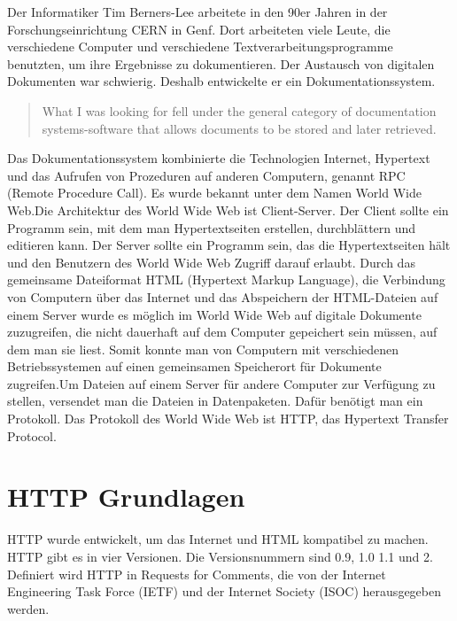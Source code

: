 \documentclass{llncs}
\begin{document}
Der Informatiker Tim Berners-Lee arbeitete in den 90er Jahren in der Forschungseinrichtung CERN in Genf. Dort arbeiteten viele Leute, die verschiedene Computer und verschiedene Textverarbeitungsprogramme benutzten, um ihre Ergebnisse zu dokumentieren. Der Austausch von digitalen Dokumenten war schwierig. Deshalb entwickelte er ein Dokumentationssystem. \begin{quote}What I was looking for fell under the general category of documentation systems-software that allows documents to be stored and later retrieved. \cite{Berners-Lee1999} \end{quote}
Das Dokumentationssystem kombinierte die Technologien Internet, Hypertext und das Aufrufen von Prozeduren auf anderen Computern, genannt RPC (Remote Procedure Call). Es wurde bekannt unter dem Namen World Wide Web.\newline Die Architektur des World Wide Web ist Client-Server. Der Client sollte ein Programm sein, mit dem man Hypertextseiten erstellen, durchblättern und editieren kann.\cite{Berners-Lee1999} Der Server sollte ein Programm sein, das die Hypertextseiten hält und den Benutzern des World Wide Web Zugriff darauf erlaubt.\cite{Berners-Lee1999} 
Durch das gemeinsame Dateiformat HTML (Hypertext Markup Language), die Verbindung von Computern über das Internet und das Abspeichern der HTML-Dateien auf einem Server wurde es möglich im World Wide Web auf digitale Dokumente zuzugreifen, die nicht dauerhaft auf dem Computer gepeichert sein müssen, auf dem man sie liest. Somit konnte man von Computern mit verschiedenen Betriebssystemen auf einen gemeinsamen Speicherort für Dokumente zugreifen.\newline Um Dateien auf einem Server für andere Computer zur Verfügung zu stellen, versendet man die Dateien in Datenpaketen. Dafür benötigt man ein Protokoll. Das Protokoll des World Wide Web ist HTTP, das Hypertext Transfer Protocol.
\section{HTTP Grundlagen}
HTTP wurde entwickelt, um das Internet und HTML kompatibel zu machen. HTTP gibt es in vier Versionen. Die Versionsnummern sind 0.9, 1.0 1.1 und 2. Definiert wird HTTP in Requests for Comments, die von der Internet Engineering Task Force (IETF) und der Internet Society (ISOC) herausgegeben werden.
\end{document}
